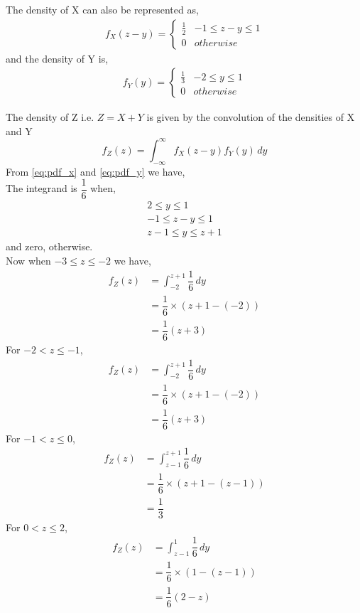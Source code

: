 \documentclass[journal,12pt,twocolumn]{IEEEtran}
\begin{document}
The density of X can also be represented as,
\begin{align}
\label{eq:pdf_x}
f_{X}(z-y)  = 
\begin{cases}
\frac{1}{2} & -1 \le z-y \le 1
\\
0 & otherwise
\end{cases}
\end{align}
and the density of Y is,
\begin{align}
\label{eq:pdf_y}
f_{Y}(y)  = 
\begin{cases}
\frac{1}{3} & -2 \le y \le 1
\\
0 & otherwise
\end{cases}
\end{align}

The density of Z i.e. $Z= X + Y $ is given by the convolution of the densities of X and Y
\begin{equation}
    f_Z(z) =  \int_{- \infty}^{\infty} f_X(z-y)f_Y(y) \,dy 
\end{equation}
From \ref{eq:pdf_x} and \ref{eq:pdf_y} we have, \\
The integrand is $\dfrac{1}{6}$ when,
\begin{align}
    2 \le y \le 1 \\
    -1 \le z-y \le 1 \\
    z-1 \le y \le z+1
\end{align}
and zero, otherwise. \\
Now when $-3 \le z \le -2$ we have, 
\begin{align}
    f_Z(z) &=   \int_{-2}^{z+1} \dfrac{1}{6} \,dy  \\
          &= \dfrac{1}{6} \times ( z+1 - (-2)) \\
          &= \dfrac{1}{6}(z+3)
\end{align}
For $ -2 < z \le -1 $,
\begin{align}
    f_Z(z) &=   \int_{-2}^{z+1} \dfrac{1}{6} \,dy  \\
          &= \dfrac{1}{6} \times ( z+1 - (-2)) \\
          &= \dfrac{1}{6}(z+3)
\end{align}
For $ -1 < z \le 0 $,
\begin{align}
    f_Z(z) &=   \int_{z-1}^{z+1} \dfrac{1}{6} \,dy  \\
          &= \dfrac{1}{6} \times ( z+1 - (z-1)) \\
          &= \dfrac{1}{3}
\end{align}
For $ 0 < z \le 2$,
\begin{align}
    f_Z(z) &=   \int_{z-1}^{1} \dfrac{1}{6} \,dy  \\
          &= \dfrac{1}{6} \times ( 1- (z-1)) \\
          &= \dfrac{1}{6}(2-z)
\end{align}
\end{document}
